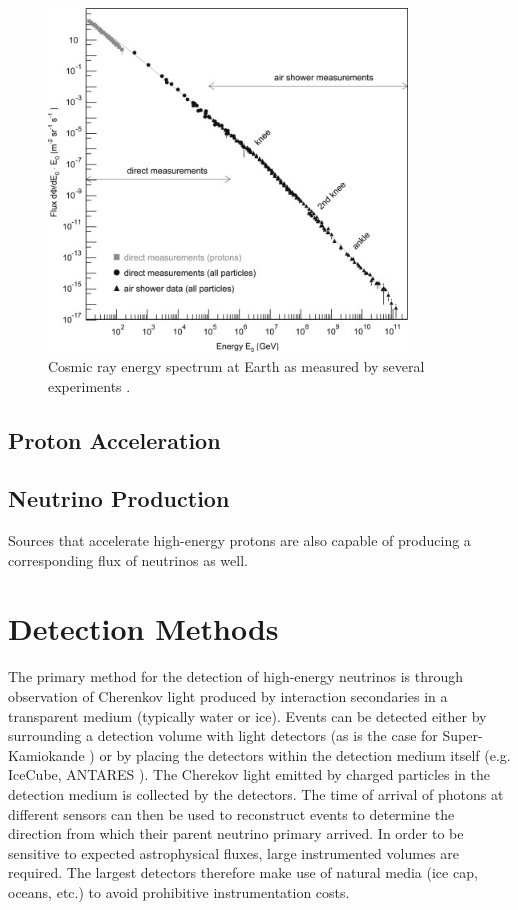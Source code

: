 \documentclass{gatech-thesis}
\begin{document}
\begin{figure}[ht]
  \begin{center}
    \includegraphics[width=0.85\textwidth,keepaspectratio]{CosmicRaySpectrum.jpg}
  \end{center}
  \caption{Cosmic ray energy spectrum at Earth as measured by several experiments \cite{2009PrPNP..63..293B}.}
  \label{fig:cosmicray_spec}
\end{figure}

\subsection{Proton Acceleration}

\subsection{Neutrino Production}
Sources that accelerate high-energy protons are also capable of producing a corresponding flux of neutrinos as well. 

\section{Detection Methods}

The primary method for the detection of high-energy neutrinos is through observation of Cherenkov light produced by interaction secondaries in a transparent medium (typically water or ice). Events can be detected either by surrounding a detection volume with light detectors (as is the case for Super-Kamiokande \cite{2003NIMPA.501..418F}) or by placing the detectors within the detection medium itself (e.g. IceCube, ANTARES \cite{2011NIMPA.656...11A}). The Cherekov light emitted by charged particles in the detection medium is collected by the detectors. The time of arrival of photons at different sensors can then be used to reconstruct events to determine the direction from  which their parent neutrino primary arrived. In order to be sensitive to expected astrophysical fluxes, large instrumented volumes are required. The largest detectors therefore make use of natural media (ice cap, oceans, etc.) to avoid prohibitive instrumentation costs.
\end{document}
